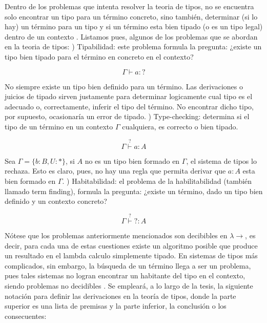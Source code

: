 \documentclass[a4paper,12pt]{report}
\theoremstyle{definition}
\theoremstyle{plain}
\theoremstyle{remark}
\begin{document}
\newline
\newline
\indent Dentro de los problemas que intenta resolver la teoria de tipos, no se encuentra solo encontrar un tipo para un término concreto, sino también, determinar (si lo hay) un término para un tipo y si un término esta bien tipado (o es un tipo legal) dentro de un contexto \citep{geuvers2014}. Listamos pues, algunos de los problemas que se abordan en la teoria de tipos:
\newline
{}) Tipabilidad: este problema formula la pregunta: ¿existe un tipo bien tipado para el término en concreto en el contexto?

\[
  \Gamma \vdash a : ?
\]

No siempre existe un tipo bien definido para un término. Las derivaciones o juicios de tipado sirven justamente para determinar logicamente cual tipo es el adecuado o, correctamente, inferir el tipo del término. No encontrar dicho tipo, por supuesto, ocasionaría un error de tipado.
\newline
{}) Type-checking: determina si el tipo de un término en un contexto $\Gamma$ cualquiera, es correcto o bien tipado.

\[
  \Gamma \overset{?}{\vdash} a : A
\]

Sea $\Gamma = \{b : B, U : *\}$, si $A$ no es un tipo bien formado en $\Gamma$, el sistema de tipos lo rechaza. Esto es claro, pues, no hay una regla que permita derivar que $a : A$ esta bien formado en $\Gamma$.
\newline
{}) Habitabilidad: el problema de la habilitabilidad (también llamado term finding), formula la pregunta: ¿existe un término, dado un tipo bien definido y un contexto concreto?

\[
  \Gamma \overset{?}{\vdash} ? : A
\]

Nótese que los problemas anteriormente mencionados son decibibles en $\lambda\to$, es decir, para cada una de estas cuestiones existe un algoritmo posible que produce un resultado en el lambda calculo simplemente tipado. En sistemas de tipos más complicados, sin embargo, la búsqueda de un término llega a ser un problema, pues tales sistemas no logran encontrar un habitante del tipo en el contexto, siendo problemas no decidibles \citep{b-calculi}.
\newline
\newline
\indent Se empleará, a lo largo de la tesis, la siguiente notación para definir las derivaciones en la teoría de tipos, donde la parte superior es una lista de premisas y la parte inferior, la conclusión o los consecuentes:
\end{document}

